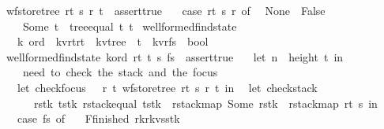\begin{isabellebody}
{\isachardoublequoteopen}wf{\isacharunderscore}store{\isacharunderscore}tree\ r{}t\ s\ r\ t\ {\isacharequal}\ assert{\isacharunderscore}true\ {\isacharparenleft}\isanewline
\ \ case\ r{}t\ s\ r\ of\isanewline
\ \ None\ {\isasymRightarrow}\ False\isanewline
\ \ {\isacharbar}\ Some\ t{\isacharprime}\ {\isasymRightarrow}\ {\isacharparenleft}tree{\isacharunderscore}equal\ t\ t{\isacharprime}{\isacharparenright}{\isacharparenright}{\isachardoublequoteclose}\isanewline
\isanewline
\isanewline
\isanewline
\isanewline
{}\isamarkupfalse%
\ wellformed{\isacharunderscore}find{\isacharunderscore}state\ {\isacharcolon}{\isacharcolon}\ \isanewline
\ \ {\isachardoublequoteopen}{\isacharprime}k\ ord\ {\isasymRightarrow}\ {\isacharparenleft}{\isacharprime}k{\isacharcomma}{\isacharprime}v{\isacharcomma}{\isacharprime}r{\isacharcomma}{\isacharprime}t{\isacharparenright}r{}t\ {\isasymRightarrow}\ {\isacharparenleft}{\isacharprime}k{\isacharcomma}{\isacharprime}v{\isacharparenright}tree\ {\isasymRightarrow}\ {\isacharprime}t\ {\isasymRightarrow}\ {\isacharparenleft}{\isacharprime}k{\isacharcomma}{\isacharprime}v{\isacharcomma}{\isacharprime}r{\isacharparenright}fs\ {\isasymRightarrow}\ bool{\isachardoublequoteclose}\ \isanewline
{}\isanewline
{\isachardoublequoteopen}wellformed{\isacharunderscore}find{\isacharunderscore}state\ k{\isacharunderscore}ord\ r{}t\ t{}\ s\ fs\ {\isacharequal}\ assert{\isacharunderscore}true\ {\isacharparenleft}\isanewline
\ \ let\ n\ {\isacharequal}\ height\ t{}\ in\isanewline
\ \ {\isacharparenleft}{\isacharasterisk}\ need\ to\ check\ the\ stack\ and\ the\ focus\ {\isacharasterisk}{\isacharparenright}\isanewline
\ \ let\ check{\isacharunderscore}focus\ {\isacharequal}\ {\isacharpercent}\ r\ t{\isachardot}\ wf{\isacharunderscore}store{\isacharunderscore}tree\ r{}t\ s\ r\ t\ in\isanewline
\ \ let\ check{\isacharunderscore}stack\ {\isacharequal}\ \isanewline
\ \ \ \ {\isacharpercent}\ rstk\ tstk{\isachardot}\ rstack{\isacharunderscore}equal\ {\isacharparenleft}tstk\ {\isacharbar}{\isachargreater}\ rstack{\isacharunderscore}map\ Some{\isacharparenright}\ {\isacharparenleft}rstk\ {\isacharbar}{\isachargreater}\ rstack{\isacharunderscore}map\ {\isacharparenleft}r{}t\ s{\isacharparenright}{\isacharparenright}\ in\ \isanewline
\ \ case\ fs\ of\ \isanewline
\ \ F{\isacharunderscore}finished\ {\isacharparenleft}r{}{\isacharcomma}k{\isacharcomma}r{\isacharcomma}kvs{\isacharcomma}stk{\isacharparenright}\ {\isasymRightarrow}\ {\isacharparenleft}\isanewline

\end{isabellebody}

